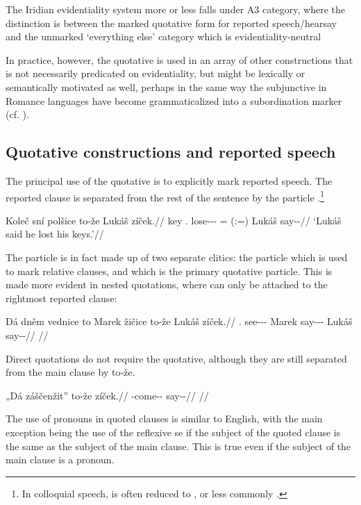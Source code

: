The Iridian evidentiality system more or less falls under
 A3 category, where the distinction is between the
marked quotative form for reported speech/hearsay and the unmarked ‘everything
else’ category which is evidentiality-neutral

In practice, however, the quotative is used in an array of other constructions
that is not necessarily predicated on evidentiality, but might be lexically or
semantically motivated as well, perhaps in the same way the subjunctive in
Romance languages have become grammaticalized into a subordination marker (cf.
\cite{poplacketal}).

\subsection{Quotative constructions and reported
speech}\label{sec:quotative-const}

The principal use of the quotative is to explicitly mark reported speech. The
reported clause is separated from the rest of the sentence by the particle
.\footnote{In colloquial speech,  is often reduced to
, or less commonly .}

\pex
  \begingl
    \gla Koleč sní polšice to-že Lukáš zíček.//
    \glb key \Refl{}.\Acc{} lose-\Av{}-\Pf{}-\Quot{} {\Rel{}=\Quot{} (:=\Qp{})} Lukáš say-\Av{}-\Pf{}//
    \glft ‘Lukáš said he lost his keys.’//
  \endgl
\xe

The particle  is in fact made up of two separate clitics: the particle  which is used to mark relative clauses, and  which is the primary quotative particle. This is made more evident in nested quotations, where  can only be attached to the rightmost reported clause:

\pex
  \begingl
    \gla Dá dněm vednice to Marek žičice to-že Lukáš zíček.//
    \glb \First{}\Sg{} \Dem{}.\Agt{} see-\Pv{}-\Pf{}-\Quot{} \Rel{} Marek say-\Av{}-\Pf{}-\Quot{} \Qp{} Lukáš say-\Av{}-\Pf{}//
    \glft {}//
  \endgl
\xe


Direct quotations do not require the quotative, although they are still
separated from the main clause by to-že.

\pex
  \begingl
    \gla „Dá záščenžit” to-že zíček.//
    \glb \First{}\Sg{} \Neg{}-come-\Av{}-\SupP{} \Qp{} say-\Av{}-\Pf{}//
    \glft {}//
  \endgl
\xe

The use of pronouns in quoted clauses is similar to English, with the main
exception being the use of the reflexive se if the subject of the quoted clause
is the same as the subject of the main clause. This is true even if the subject
of the main clause is a pronoun.

